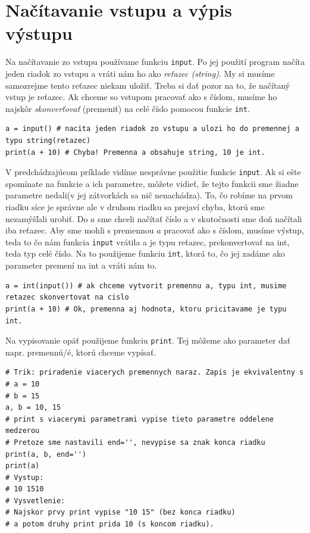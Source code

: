 \documentclass{article}
\begin{document}
\section{Načítavanie vstupu a výpis výstupu}


Na načítavanie zo vstupu používame funkciu \texttt{input}. Po jej použití program načíta jeden riadok zo vstupu
a vráti nám ho ako \textit{reťazec (string)}. My si musíme samozrejme tento reťazec niekam uložiť. Treba si dať pozor na to, že načítaný vstup je reťazec. Ak chceme so vstupom pracovať ako s číslom, musíme ho najskôr \textit{skonverťovať} (premeniť) na celé číslo pomocou funkcie \texttt{int}.

\begin{lstlisting}
a = input() # nacita jeden riadok zo vstupu a ulozi ho do premennej a typu string(retazec)
print(a + 10) # Chyba! Premenna a obsahuje string, 10 je int.
\end{lstlisting}

V predchádzajúcom príklade vidíme nesprávne použitie funkcie \texttt{input}. Ak si ešte spomínate na funkcie a ich parametre, môžete vidieť, že tejto funkcii sme žiadne parametre nedali(v jej zátvorkách sa nič nenachádza). To, čo robíme na prvom riadku síce je správne ale v druhom riadku sa prejaví chyba, ktorú sme nezamýšľali urobiť. Do $a$ sme chceli načítať číslo a v skutočnosti sme doň načítali iba reťazec. Aby sme mohli s premennou $a$ pracovať ako s číslom, musíme výstup, teda to čo nám funkcia \texttt{input} vrátila a je typu reťazec, prekonvertovať na int, teda typ celé číslo. Na to použijeme funkciu \texttt{int}, ktorá to, čo jej zadáme ako parameter premení na int a vráti nám to.

\begin{lstlisting}
a = int(input()) # ak chceme vytvorit premennu a, typu int, musime retazec skonvertovat na cislo
print(a + 10) # Ok, premenna aj hodnota, ktoru pricitavame je typu int.
\end{lstlisting}

Na vypisovanie opäť použijeme funkciu \texttt{print}.
Tej môžeme ako parameter dať napr. premennú/é, ktorú chceme vypísať.

\begin{lstlisting}
# Trik: priradenie viacerych premennych naraz. Zapis je ekvivalentny s
# a = 10
# b = 15
a, b = 10, 15
# print s viacerymi parametrami vypise tieto parametre oddelene medzerou
# Pretoze sme nastavili end='', nevypise sa znak konca riadku
print(a, b, end='')
print(a)
# Vystup:
# 10 1510
# Vysvetlenie:
# Najskor prvy print vypise "10 15" (bez konca riadku)
# a potom druhy print prida 10 (s koncom riadku).
\end{lstlisting}
\end{document}

